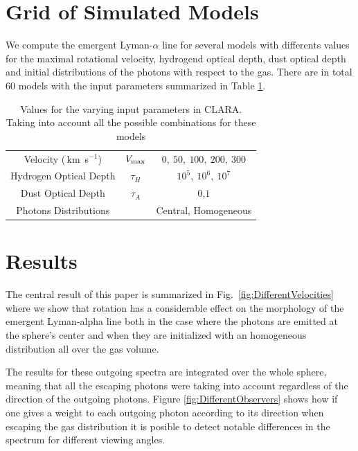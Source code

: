 \documentclass[usenatbib]{mn2e}
\newcommand{\kms}{\,km~s$^{-1}$}
\begin{document}
\section{Grid of Simulated Models}
\label{sec:models}

We compute the emergent Lyman-$\alpha$ line for several models with
differents values for the maximal rotational velocity, hydrogend optical
depth, dust optical depth and initial distributions of the photons
with respect to the gas. There are in total 60 models with the input
parameters summarized in Table  \ref{table:models}. 

\begin{table}
\begin{center}
\begin{tabular}{ccc}\hline
Velocity (\kms) & $V_{\rm max}$&$0,\ 50,\ 100,\ 200,\ 300$\\
Hydrogen Optical Depth & $\tau_{H} $ & $10^{5},\ 10^{6},\ 10^{7}$\\
Dust Optical Depth & $\tau_{A}$ & $0$,$1$\\
Photons Distributions & & Central, Homogeneous\\
\hline
\end{tabular}
\caption{
Values for the varying input parameters in CLARA. Taking into account
all the possible combinations for these models
} 
\label{table:models}
\end{center}
\end{table}







\section{Results}
\label{sec:results}

The central result of this paper is summarized in
Fig.~\ref{fig:DifferentVelocities} where we show that rotation has a
considerable effect on the morphology of the emergent Lyman-alpha line
both in the case where the photons are emitted at the sphere's center
and when they are initialized with an homogeneous distribution all
over the gas volume.

The results for these outgoing spectra are integrated over the whole
sphere, meaning that all the escaping photons were taking into account
regardless of the direction of the outgoing photons. Figure
\ref{fig:DifferentObservers} shows how if one gives a weight to each outgoing
photon according to its direction when escaping the gas distribution
it is posible to detect notable differences in the spectrum for
different viewing angles.
\end{document}
